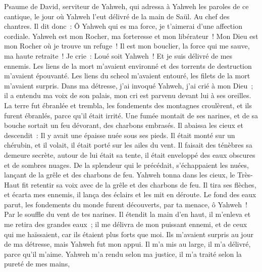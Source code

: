 \begin{multicols}{2}
\VerseOne{}Psaume de David, serviteur de Yahweh, qui adressa à Yahweh les paroles de ce cantique, le jour où Yahweh l'eut délivré de la main de Saül. Au chef des chantres.
Il dit donc~: Ô Yahweh qui es ma force, je t'aimerai d'une affection cordiale.
Yahweh est mon Rocher, ma forteresse et mon libérateur~! Mon Dieu est mon Rocher où je trouve un refuge~! Il est mon bouclier, la force qui me sauve, ma haute retraite~!
Je crie~: Loué soit Yahweh~! Et je suis délivré de mes ennemis.
Les liens de la mort m'avaient environné et des torrents de destruction m'avaient épouvanté.
Les liens du scheol m'avaient entouré, les filets de la mort m'avaient surpris.
Dans ma détresse, j'ai invoqué Yahweh, j'ai crié à mon Dieu~; il a entendu ma voix de son palais, mon cri est parvenu devant lui à ses oreilles.
La terre fut ébranlée et trembla, les fondements des montagnes croulèrent, et ils furent ébranlés, parce qu'il était irrité.
Une fumée montait de ses narines, et de sa bouche sortait un feu dévorant, des charbons embrasés.
Il abaissa les cieux et descendit~: Il y avait une épaisse nuée sous ses pieds.
Il était monté sur un chérubin, et il volait, il était porté sur les ailes du vent.
Il faisait des ténèbres sa demeure secrète, autour de lui était sa tente, il était enveloppé des eaux obscures et de sombres nuages.
De la splendeur qui le précédait, s'échappaient les nuées, lançant de la grêle et des charbons de feu.
Yahweh tonna dans les cieux, le Très-Haut fit retentir sa voix avec de la grêle et des charbons de feu.
Il tira ses flèches, et écarta mes ennemis, il lança des éclairs et les mit en déroute.
Le fond des eaux parut, les fondements du monde furent découverts, par ta menace, ô Yahweh~! Par le souffle du vent de tes narines.
Il étendit la main d'en haut, il m'enleva et me retira des grandes eaux~;
il me délivra de mon puissant ennemi, et de ceux qui me haïssaient, car ils étaient plus forts que moi.
Ils m'avaient surpris au jour de ma détresse, mais Yahweh fut mon appui.
Il m'a mis au large, il m'a délivré, parce qu'il m'aime.
Yahweh m'a rendu selon ma justice, il m'a traité selon la pureté de mes mains,

\end{multicols}
